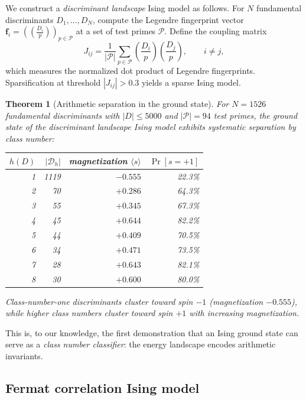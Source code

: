 \documentclass[11pt]{amsart}
\newtheorem{theorem}{Theorem}[section]
\theoremstyle{definition}
\begin{document}
We construct a \emph{discriminant landscape} Ising model as follows. For $N$ fundamental discriminants $D_1, \ldots, D_N$, compute the Legendre fingerprint vector $\mathbf{f}_i = (\left(\frac{D_i}{p}\right))_{p \in \mathcal{P}}$ at a set of test primes $\mathcal{P}$. Define the coupling matrix
\[
J_{ij} = \frac{1}{|\mathcal{P}|}\sum_{p \in \mathcal{P}} \left(\frac{D_i}{p}\right)\left(\frac{D_j}{p}\right), \qquad i \neq j,
\]
which measures the normalized dot product of Legendre fingerprints. Sparsification at threshold $|J_{ij}| > 0.3$ yields a sparse Ising model.

\begin{theorem}[Arithmetic separation in the ground state]\label{thm:separation}
For $N = 1526$ fundamental discriminants with $|D| \leq 5000$ and $|\mathcal{P}| = 94$ test primes, the ground state of the discriminant landscape Ising model exhibits systematic separation by class number:

\begin{center}
\begin{tabular}{r r r r}
\toprule
$h(D)$ & $|\mathcal{D}_h|$ & magnetization $\langle s \rangle$ & $\Pr[s = +1]$ \\
\midrule
1 & 1119 & $-0.555$ & 22.3\% \\
2 & 70 & $+0.286$ & 64.3\% \\
3 & 55 & $+0.345$ & 67.3\% \\
4 & 45 & $+0.644$ & 82.2\% \\
5 & 44 & $+0.409$ & 70.5\% \\
6 & 34 & $+0.471$ & 73.5\% \\
7 & 28 & $+0.643$ & 82.1\% \\
8 & 30 & $+0.600$ & 80.0\% \\
\bottomrule
\end{tabular}
\end{center}

Class-number-one discriminants cluster toward spin $-1$ (magnetization $-0.555$), while higher class numbers cluster toward spin $+1$ with increasing magnetization.
\end{theorem}

This is, to our knowledge, the first demonstration that an Ising ground state can serve as a \emph{class number classifier}: the energy landscape encodes arithmetic invariants.

\subsection{Fermat correlation Ising model}
\label{sec:fermat-ising}
\end{document}
